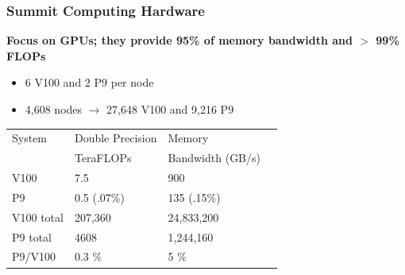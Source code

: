\documentclass[aspectratio=169]{beamer}
\begin{document}
\begin{frame}
  \frametitle{Summit Computing Hardware}
  \textbf{Focus on GPUs; they provide 95\% of memory bandwidth and $>$ 99\% FLOPs}
  \begin{itemize}
    \item 6 V100 and 2 P9 per node
    \item 4,608 nodes $\rightarrow$ 27,648 V100 and 9,216 P9
  \end{itemize}
  {
  \begin{table}[]
    \begin{tabular}{llll}
      System     & Double Precision & Memory           \\
                 & TeraFLOPs        & Bandwidth (GB/s) \\
      V100       & 7.5              & 900              \\
      P9         & 0.5 (.07\%)      & 135 (.15\%)      \\
      V100 total & 207,360          & 24,833,200       \\
      P9 total   & 4608             & 1,244,160       \\
      \hline
      P9/V100    & 0.3 \%           & 5 \%
    \end{tabular}
  \end{table}
  }
\end{frame}
\end{document}
